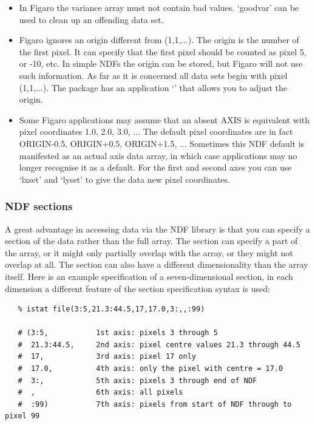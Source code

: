 \begin{itemize}
\item
   In Figaro the variance array must not contain bad values. `goodvar'
   can be used to clean up an offending data set.
\item
   Figaro ignores an origin different from (1,1,...).
   The origin is the number of the first pixel. It can specify that the
   first pixel should be counted as pixel 5, or -10, etc. In simple NDFs
   the origin can be stored, but Figaro will not use such
   information. As far as it is concerned all data sets begin with
   pixel (1,1,...). The  package has an
   application `' that allows you to
   adjust the origin.
\item
   Some Figaro applications may assume that an absent AXIS is
   equivalent with pixel coordinates 1.0, 2.0, 3.0, ...
   The default pixel coordinates are in fact ORIGIN-0.5,
   ORIGIN+0.5, ORIGIN+1.5, ...
   Sometimes this NDF default is manifested as an actual axis
   data array, in which case applications may no longer recognise it as
   a default. For the first and second axes you can use `lxset' and
   `lyset' to give the data new pixel coordinates.
\end{itemize}


\subsubsection{\label{filesndfsect}NDF sections}

   A great advantage in accessing data via the NDF library is that you
   can specify a section of the data rather than the full array.
   The section can specify a part of the array, or it might only
   partially overlap with the array, or they might not overlap at
   all. The section can also have a different
   dimensionality than the array itself. Here is an example
   specification of a seven-dimensional section, in each dimension a
   different feature of the section specification syntax is used:

\begin{verbatim}
   % istat file(3:5,21.3:44.5,17,17.0,3:,,:99)

   # (3:5,           1st axis: pixels 3 through 5
   #  21.3:44.5,     2nd axis: pixel centre values 21.3 through 44.5
   #  17,            3rd axis: pixel 17 only
   #  17.0,          4th axis: only the pixel with centre = 17.0
   #  3:,            5th axis: pixels 3 through end of NDF
   #  ,              6th axis: all pixels
   #  :99)           7th axis: pixels from start of NDF through to pixel 99
\end{verbatim}

